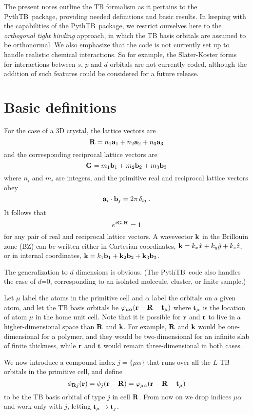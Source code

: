 \documentclass[11pt]{article}
\numberwithin{equation}{section} %
\def\beq{\begin{equation}}
\def\eeq{\end{equation}}
\def\PythTB{{\sc PythTB}}
\def\k{{\bf k}}
\def\r{{\bf r}}
\def\R{{\bf R}}
\def\G{{\bf G}}
\def\t{{\bf t}}
\def\a{{\bf a}}
\def\b{{\bf b}}
\def\t{{\bf t}}
\begin{document}
The present notes outline the TB formalism as it pertains to the
\PythTB\ package, providing needed definitions and basic results.
In keeping with the capabilities of the \PythTB\ package, we restrict
ourselves here to the \textit{orthogonal tight binding} approach, in which
the TB basis orbitals are assumed to be orthonormal.  We also
emphasize that the code is not currently set up to handle realistic
chemical interactions. So for example, the Slater-Koster
forms~\cite{wiki-tb-me} for interactions between $s$, $p$ and $d$
orbitals are not currently coded, although the addition of such
features could be considered for a future release.

\section{Basic definitions}

For the case of a 3D crystal, the lattice vectors are
%
\beq
\R=n_1\a_1+n_2\a_2+n_3\a_3
\eeq
%
and the corresponding reciprocal lattice vectors are
%
\beq
\G=m_1\b_1+m_2\b_2+m_3\b_3
\eeq
%
where $n_i$ and $m_i$ are integers, and the primitive real
and reciprocal lattice vectors obey
%
\beq
\a_i\cdot\b_j=2\pi\,\delta_{ij} \;.
\eeq
%
It follows that
%
\beq
e^{i\G\cdot\R}=1
\label{eq:ide}
\eeq
%
for any pair of real and reciprocal lattice vectors.
A wavevector $\k$ in the Brillouin zone (BZ) can be written either in
Cartesian coordinates, $\k=k_x\hat{x}+k_y\hat{y}+k_z\hat{z}$, or
in internal coordinates, $\k=k_1\b_1+\k_2\b_2+\k_3\b_3$.

The generalization to $d$ dimensions is obvious.  (The \PythTB\ code
also handles the case of $d$=0, corresponding to an isolated molecule,
cluster, or finite sample.)

Let $\mu$ label the atoms in the primitive cell and $\alpha$ label the
orbitals on a given atom, and let the TB basis orbitals
be $\varphi_{\mu\alpha}(\r-\R-\t_\mu)$ where $\t_\mu$ is the location of
atom $\mu$ in the home unit cell.  Note that it
is possible for $\r$ and $\t$ to live in a higher-dimensional
space than $\R$ and $\k$.  For example, $\R$ and $\k$ would be
one-dimensional for a polymer, and they would be two-dimensional
for an infinite slab of finite thickness, while  $\r$ and $\t$
would remain three-dimensional in both cases.

We now introduce a compound index $j=\{\mu\alpha\}$ that runs over
all the $L$ TB orbitals in the primitive cell, and define
%
\beq
\phi_{\R j}(\r)=\phi_j(\r-\R)=\varphi_{\mu\alpha}(\r-\R-\t_\mu)
\eeq
%
to be the TB basis orbital of type $j$ in cell $\R$.
From now on we drop indices ${\mu\alpha}$ and work only with $j$,
letting $\t_\mu\rightarrow \t_j$.
\end{document}
